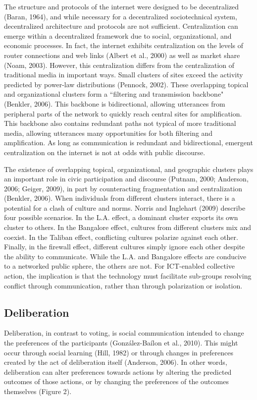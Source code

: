 The structure and protocols of the internet were designed to be decentralized (Baran, 1964), and while necessary for a decentralized sociotechnical system, decentralized architecture and protocols are not sufficient. Centralization can emerge within a decentralized framework due to social, organizational, and economic processes. In fact, the internet exhibits centralization on the levels of router connections and web links (Albert et al., 2000) as well as market share (Noam, 2003). However, this centralization differs from the centralization of traditional media in important ways. Small clusters of sites exceed the activity predicted by power-law distributions (Pennock, 2002). These overlapping topical and organizational clusters form a “filtering and transmission backbone" (Benkler, 2006). This backbone is bidirectional, allowing utterances from peripheral parts of the network to quickly reach central sites for amplification. This backbone also contains redundant paths not typical of more traditional media, allowing utterances many opportunities for both filtering and amplification. As long as communication is redundant and bidirectional, emergent centralization on the internet is not at odds with public discourse.

The existence of overlapping topical, organizational, and geographic clusters plays an important role in civic participation and discourse (Putnam, 2000; Anderson, 2006; Geiger, 2009), in part by counteracting fragmentation and centralization (Benkler, 2006). When individuals from different clusters interact, there is a potential for a clash of culture and norms. Norris and Inglehart (2009) describe four possible scenarios. In the L.A. effect, a dominant cluster exports its own cluster to others. In the Bangalore effect, cultures from different clusters mix and coexist. In the Taliban effect, conflicting cultures polarize against each other. Finally, in the firewall effect, different cultures simply ignore each other despite the ability to communicate. While the L.A. and Bangalore effects are conducive to a networked public sphere, the others are not. For ICT-enabled collective action, the implication is that the technology must facilitate sub-groups resolving conflict through communication, rather than through polarization or isolation.

\subsection{Deliberation}
Deliberation, in contrast to voting, is social communication intended to change the preferences of the participants (Gonz\'alez-Ba\'ilon et al., 2010). This might occur through social learning (Hill, 1982) or through changes in preferences created by the act of deliberation itself (Anderson, 2006). In other words, deliberation can alter preferences towards actions by altering the predicted outcomes of those actions, or by changing the preferences of the outcomes themselves (Figure 2).

